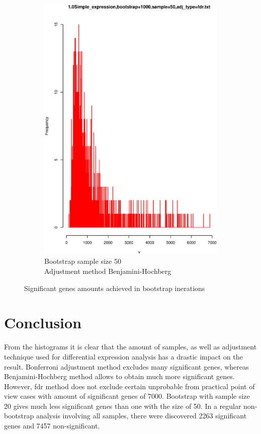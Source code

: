 \documentclass[11pt,a4paper,oneside]{article}
\begin{document}
\begin{figure}
\begin{subfigure}[b]{0.4\textwidth}
\includegraphics[width=\textwidth]{1.0Simple_expression,bootstrap=1000,sample=50,adj_type=fdr.txt.eps}
\caption{Bootstrap sample size 50\\Adjustment method Benjamini-Hochberg}
\label{fig:pm4}
\end{subfigure}
\caption{Significant genes amounts achieved in bootstrap inerations}\label{fig:allfigures}
\end{figure}


\section{Conclusion}

From the histograms it is clear that the amount of samples, as well as adjustment technique used for differential expression analysis has a drastic impact on the result.
Bonferroni adjustment method excludes many significant genes, whereas Benjamini-Hochberg method allows to obtain much more significant genes. However, fdr method does not exclude certain unprobable from practical point of view cases with amount of significant genes of 7000.
Bootstrap with sample size 20 gives much less significant genes than one with the size of 50.
In a regular non-bootstrap analysis involving all samples, there were discovered 2263 significant genes and 7457 non-significant. 
\end{document}
